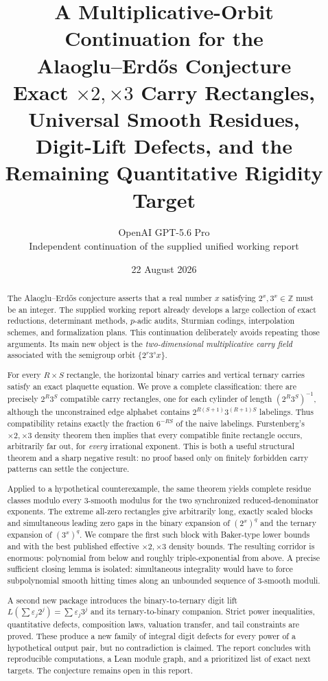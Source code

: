 \documentclass[11pt]{article}
\title{\bfseries A Multiplicative-Orbit Continuation for the\\
Alaoglu--Erd\H{o}s Conjecture\\[0.4em]
\large Exact $\times2,\times3$ Carry Rectangles, Universal Smooth Residues,\\
Digit-Lift Defects, and the Remaining Quantitative Rigidity Target}
\author{OpenAI GPT-5.6 Pro\\
\small Independent continuation of the supplied unified working report}
\date{22 August 2026}
\theoremstyle{definition}
\theoremstyle{remark}
\newcommand{\Z}{\mathbb Z}
\begin{document}
\maketitle

\begin{abstract}
The Alaoglu--Erd\H{o}s conjecture asserts that a real number $x$ satisfying
$2^x,3^x\in\Z$ must be an integer.  The supplied working report already develops a
large collection of exact reductions, determinant methods, $p$-adic audits,
Sturmian codings, interpolation schemes, and formalization plans.  This continuation
deliberately avoids repeating those arguments.  Its main new object is the
\emph{two-dimensional multiplicative carry field}
associated with the semigroup orbit $\{2^r3^s x\}$.

For every $R\times S$ rectangle, the horizontal binary carries and vertical ternary
carries satisfy an exact plaquette equation.  We prove a complete classification:
there are precisely $2^R3^S$ compatible carry rectangles, one for each cylinder of
length $(2^R3^S)^{-1}$, although the unconstrained edge alphabet contains
$2^{R(S+1)}3^{(R+1)S}$ labelings.  Thus compatibility retains exactly the fraction
$6^{-RS}$ of the naive labelings.  Furstenberg's $\times2,\times3$ density theorem then
implies that every compatible finite rectangle occurs, arbitrarily far out, for
\emph{every} irrational exponent.  This is both a useful structural theorem and a
sharp negative result: no proof based only on finitely forbidden carry patterns can
settle the conjecture.

Applied to a hypothetical counterexample, the same theorem yields complete residue
classes modulo every $3$-smooth modulus for the two synchronized reduced-denominator
exponents.  The extreme all-zero rectangles give arbitrarily long, exactly scaled
blocks and simultaneous leading zero gaps in the binary expansion of $(2^x)^q$ and
the ternary expansion of $(3^x)^q$.  We compare the first such block with Baker-type
lower bounds and with the best published effective $\times2,\times3$ density bounds.
The resulting corridor is enormous: polynomial from below and roughly
triple-exponential from above.  A precise sufficient closing lemma is isolated:
simultaneous integrality would have to force subpolynomial smooth hitting times along
an unbounded sequence of $3$-smooth moduli.

A second new package introduces the binary-to-ternary digit lift
$L(\sum\varepsilon_j2^j)=\sum\varepsilon_j3^j$ and its ternary-to-binary companion.
Strict power inequalities, quantitative defects, composition laws, valuation
transfer, and tail constraints are proved.  These produce a new family of integral
digit defects for every power of a hypothetical output pair, but no contradiction is
claimed.  The report concludes with reproducible computations, a Lean module graph,
and a prioritized list of exact next targets.  The conjecture remains open in this
report.
\end{abstract}
\end{document}
